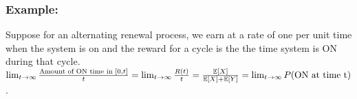 \documentclass[a4paper,10pt,english]{article}
\begin{document}
 \subsubsection{Example:} Suppose for an alternating renewal process, we earn at a rate of one per unit time  when the system is on and the reward for a cycle is the the time system is ON during that cycle.\\
 $ \lim_{t \rightarrow \infty} \frac{\text{Amount of ON time in } [0,t]}{t} = \lim_{t \rightarrow \infty} \frac{R(t)}{t}=\frac{\mathbb{E}[X]}{\mathbb{E}[X]+\mathbb{E}[Y]} = \lim_{t \rightarrow \infty}P(\text{ON at time t})$. 
\end{document}
